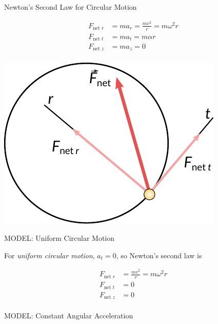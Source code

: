 \documentclass{summarysheet}
\begin{document}
\begin{multicols}{2}
\begin{topicbox}{Newton's Second Law for Circular Motion}
\begin{multicols}{2}


\begin{teqbox}
\begin{align*}
F_\text{net $r$} & = ma_r  = \frac{mv^2}{r} = m\omega^2 r \\
F_\text{net $t$} & = ma_t  = m \alpha r \\
F_\text{net $z$} & = ma_z = 0 \\
\end{align*}
\end{teqbox}

\begin{center}
\includegraphics[scale=0.6]{fig_fnet.pdf}
\end{center}

\end{multicols}

\end{topicbox}


\begin{topicbox}{MODEL: Uniform Circular Motion}

\noindent For \emph{uniform circular motion}, $a_t = 0$, so Newton's second law is
\begin{teqbox}
\begin{align*}
F_\text{net $r$} & = \frac{mv^2}{r} = m\omega^2 r \\
F_\text{net $t$} & = 0\\
F_\text{net $z$} & = 0 \\
\end{align*}
\end{teqbox}

\end{topicbox}

\begin{topicbox}{MODEL: Constant Angular Acceleration}


\end{topicbox}
\end{multicols}
\end{document}
